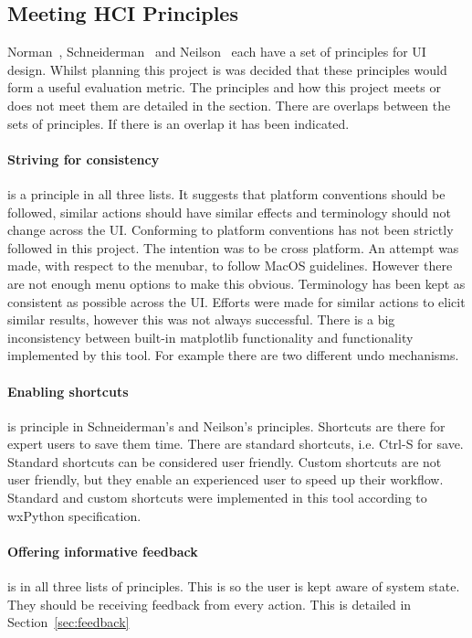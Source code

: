 

\subsection{Meeting HCI Principles}

Norman~\cite{normsev}, Schneiderman~\cite{shgold} and Neilson~\cite{neilten} each have a set of principles for \ac{UI} design.  Whilst planning this project is was decided that these principles would form a useful evaluation metric.  The principles and how this project meets or does not meet them are detailed in the section.  There are overlaps between the sets of principles.  If there is an overlap it has been indicated.

\paragraph*{Striving for consistency} is a principle in all three lists.  It suggests that platform conventions should be followed, similar actions should have similar effects and terminology should not change across the \ac{UI}.  Conforming to platform conventions has not been strictly followed in this project.  The intention was to be cross platform.  An attempt was made, with respect to the menubar, to follow MacOS guidelines.  However there are not enough menu options to make this obvious.  Terminology has been kept as consistent as possible across the \ac{UI}.  Efforts were made for similar actions to elicit similar results, however this was not always successful.  There is a big inconsistency between built-in matplotlib functionality and functionality implemented by this tool.  For example there are two different undo mechanisms.

\paragraph*{Enabling shortcuts} is principle in Schneiderman's and Neilson's principles.  Shortcuts are there for expert users to save them time.  There are standard shortcuts, i.e. Ctrl-S for save.  Standard shortcuts can be considered user friendly.  Custom shortcuts are not user friendly, but they enable an experienced user to speed up their workflow.  Standard and custom shortcuts were implemented in this tool according to wxPython specification.

\paragraph*{Offering informative feedback} is in all three lists of principles.  This is so the user is kept aware of system state.  They should be receiving feedback from every action.  This is detailed in Section~\ref{sec:feedback}

